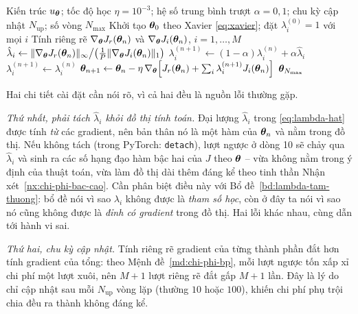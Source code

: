 \begin{algorithm}[htbp]
\caption{Huấn luyện PINNs với cân bằng tốc độ học thích nghi}
\label{alg:annealing}
\begin{algorithmic}[1]
\Require Kiến trúc $u_{\bm{\theta}}$; tốc độ học $\eta = 10^{-3}$; hệ số trung bình
  trượt $\alpha = 0{,}1$; chu kỳ cập nhật $N_{\text{up}}$; số vòng $N_{\max}$
\State Khởi tạo $\bm{\theta}_{0}$ theo Xavier \eqref{eq:xavier}; đặt
  $\lambda_{i}^{(0)} = 1$ với mọi $i$
    \State Tính riêng rẽ $\nabla_{\bm{\theta}}J_{r}(\bm{\theta}_{n})$ và
           $\nabla_{\bm{\theta}}J_{i}(\bm{\theta}_{n})$, $i=1,\dots,M$
    \State $\hat{\lambda}_{i} \gets
           \lVert\nabla_{\bm{\theta}}J_{r}(\bm{\theta}_{n})\rVert_{\infty}
           \big/ \big(\tfrac{1}{P}\lVert\nabla_{\bm{\theta}}J_{i}
           (\bm{\theta}_{n})\rVert_{1}\big)$
    \State $\lambda_{i}^{(n+1)} \gets
           (1-\alpha)\lambda_{i}^{(n)} + \alpha\hat{\lambda}_{i}$
  \Else
    \State $\lambda_{i}^{(n+1)} \gets \lambda_{i}^{(n)}$
  \EndIf
  \State $\bm{\theta}_{n+1} \gets \bm{\theta}_{n} - \eta\,\nabla_{\bm{\theta}}
         \Big[J_{r}(\bm{\theta}_{n})
         + \sum_{i} \lambda_{i}^{(n+1)} J_{i}(\bm{\theta}_{n})\Big]$
\EndFor
\State \Return $\bm{\theta}_{N_{\max}}$
\end{algorithmic}
\end{algorithm}
 
Hai chi tiết cài đặt cần nói rõ, vì cả hai đều là nguồn lỗi thường gặp.
 
\emph{Thứ nhất, phải tách $\hat\lambda_i$ khỏi đồ thị tính toán.} Đại lượng
$\hat{\lambda}_{i}$ trong \eqref{eq:lambda-hat} được tính \emph{từ} các gradient,
nên bản thân nó là một hàm của $\bm{\theta}_n$ và nằm trong đồ thị. Nếu không tách
(trong PyTorch: \texttt{detach}), lượt ngược ở dòng 10 sẽ chảy qua $\hat\lambda_i$
và sinh ra các số hạng đạo hàm bậc hai của $J$ theo $\bm{\theta}$ -- vừa không nằm
trong ý định của thuật toán, vừa làm đồ thị dài thêm đáng kể theo tinh thần
Nhận xét~\ref{nx:chi-phi-bac-cao}. Cần phân biệt điều này với
Bổ đề~\ref{bd:lambda-tam-thuong}: bổ đề nói vì sao $\lambda_i$ không được là
\emph{tham số học}, còn ở đây ta nói vì sao nó cũng không được là \emph{đỉnh có
gradient} trong đồ thị. Hai lỗi khác nhau, cùng dẫn tới hành vi sai.
 
\emph{Thứ hai, chu kỳ cập nhật.} Tính riêng rẽ gradient của từng thành phần đắt
hơn tính gradient của tổng: theo Mệnh đề~\ref{md:chi-phi-bp}, mỗi lượt ngược tốn
xấp xỉ chi phí một lượt xuôi, nên $M+1$ lượt riêng rẽ đắt gấp $M+1$ lần. Đây là
lý do chỉ cập nhật sau mỗi $N_{\text{up}}$ vòng lặp (thường $10$ hoặc $100$),
khiến chi phí phụ trội chia đều ra thành không đáng kể.
 

